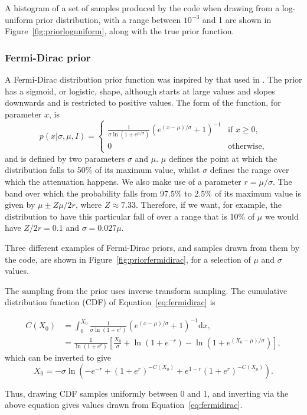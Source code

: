 A histogram of a set of samples produced by the code when drawing from a log-uniform prior distribution, with a range between
$10^{-3}$ and 1 are shown in Figure~\ref{fig:priorloguniform},
along with the true prior function.

\subsubsection{Fermi-Dirac prior}\label{sec:fdprior}

A Fermi-Dirac distribution prior function was inspired by that used in \citet{Middleton_2015}. The prior has a sigmoid, or logistic,
shape, although starts at large values and slopes downwards and is restricted to positive values. The form of the function, for
parameter $x$, is
\begin{equation}\label{eq:fermidirac}
 p(x|\sigma, \mu, I) = \begin{cases}\frac{1}{\sigma\ln{\left(1+e^{\mu/\sigma} \right)}}\left(e^{(x-\mu)/\sigma} + 1\right)^{-1} & \text{if } x \geqslant 0, \\
                        0 & \text{otherwise},
                       \end{cases}
\end{equation}
and is defined by two parameters $\sigma$ and $\mu$. $\mu$ defines the point at which the distribution falls to 50\% of
its maximum value, whilst $\sigma$ defines the range over which the attenuation happens. We also make use of a parameter
$r = \mu/\sigma$. The band over which the probability falls from 97.5\% to 2.5\% of its maximum value is given by $\mu \pm Z\mu/2r$, where
$Z\approx7.33$. Therefore, if we want, for example, the distribution to have this particular fall of over a range that is 10\% of $\mu$
we would have $Z/2r = 0.1$ and $\sigma = 0.027\mu$.

Three different examples of Fermi-Dirac priors, and samples drawn from them by the code, are shown in Figure~\ref{fig:priorfermidirac},
for a selection of $\mu$ and $\sigma$ values.

The sampling from the prior uses inverse transform sampling. The cumulative distribution function (CDF) of Equation~\ref{eq:fermidirac}
is
\begin{widetext}
\begin{align}
 C(X_0) &= \int_0^{X_0} \frac{1}{\sigma\ln{\left(1+e^{r} \right)}}\left(e^{(x-\mu)/\sigma} + 1\right)^{-1} \text{d}x, \nonumber \\
 &= \frac{1}{\ln{\left(1+e^{r}\right)}}\left[\frac{X_0}{\sigma} + \ln{\left(1+e^{-r} \right)} - \ln{\left( 1+e^{(X_0-\mu)/\sigma}\right)} \right],
\end{align}
which can be inverted to give
\begin{equation}
X_0 = -\sigma \ln{}\left(-e^{-r} + \left(1+e^{r} \right)^{-C(X_0)} + e^{1-r}\left(1+e^{r} \right)^{-C(X_0)} \right).
\end{equation}
\end{widetext}
Thus, drawing CDF samples uniformly between 0 and 1, and inverting via the above equation gives values drawn from Equation~\ref{eq:fermidirac}.

